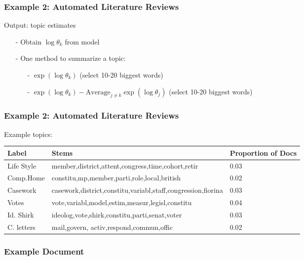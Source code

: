 \documentclass{beamer}
\numberwithin{equation}{section}
\begin{document}
\begin{frame}
\frametitle{Example 2: Automated Literature Reviews} 

Output: topic estimates
\begin{itemize}
\item[-] Obtain $\log \theta_k$ from model 
\item[-] One method to summarize a topic:
\begin{itemize}
\item[-] $\exp(\log \theta_k) $ (select 10-20 biggest words) 
\item[-] $\exp(\log \theta_k) - \text{Average}_{j\neq k} \exp(\log \theta_j)$ (select 10-20 biggest words) 
\end{itemize}
\end{itemize}


\end{frame}

\begin{frame}
\frametitle{Example 2: Automated Literature Reviews} 
Example topics:
\small
\begin{tabular}{lll} 
\hline\hline
Label & Stems & Proportion of Docs \\
\hline
Life Style & member,district,attent,congress,time,cohort,retir & 0.03  \\
Comp.Home & constitu,mp,member,parti,role,local,british &  0.02  \\
Casework & casework,district,constitu,variabl,staff,congression,fiorina & 0.03\\
Votes & vote,variabl,model,estim,measur,legisl,constitu & 0.04 \\
Id. Shirk & ideolog,vote,shirk,constitu,parti,senat,voter & 0.03\\
C. letters & mail,govern, activ,respond,commun,offic &  0.02\\
\hline 
\hline 
\end{tabular} 


\end{frame}

\begin{frame}
\frametitle{Example Document}




\end{frame}
\end{document}
